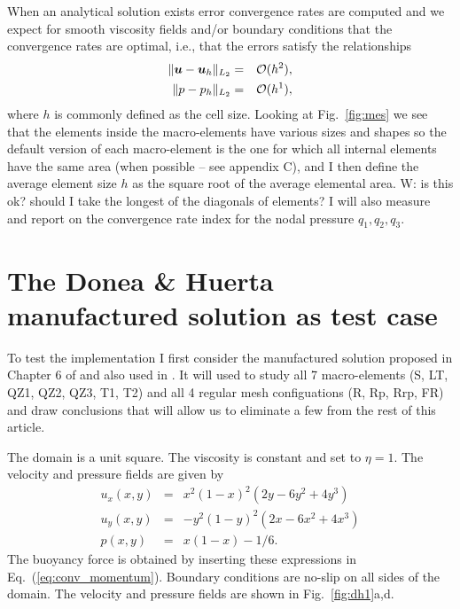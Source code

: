 \documentclass[a4paper,12pt]{article}
\begin{document}
When an analytical solution exists error convergence rates are computed and 
we expect for smooth viscosity fields and/or boundary conditions that the convergence rates 
are optimal, i.e., that the errors satisfy the relationships
\begin{eqnarray}
\| {\bm u} - {\bm u}_h \|_{L_2} &=&  {\cal O}(h^{2}),     \\  
\| p - p_h \|_{L_2}   &=& {\cal O}(h^{1}),
  \label{eq:error-rates}
\end{eqnarray}
where $h$ is commonly defined as the cell size.
Looking at Fig.~\ref{fig:mes} we see that the elements inside the macro-elements 
have various sizes and shapes so 
the default version of each macro-element is the one for which all internal elements have the same area
(when possible -- see appendix C), and I then define the average element size
$h$ as the square root of the average elemental area.
{\color{blue} W: is this ok? should I take the longest of the diagonals of elements?}
I will also measure and report on the convergence rate index for the nodal pressure $q_1,q_2,q_3$.


\section{The Donea \& Huerta manufactured solution as test case}

To test the implementation I first consider the manufactured solution 
proposed in Chapter 6 of \cite{dohu03} and also used in \cite{thba22,thba25}.
It will used to study all 7 macro-elements (S, LT, QZ1, QZ2, QZ3, T1, T2)
and all 4 regular mesh configuations (R, Rp, Rrp, FR) and draw conclusions 
that will allow us to eliminate a few from the rest of this article.
 
The domain is a unit square. The viscosity is constant and set to $\eta=1$.
The velocity and pressure fields are given by
\begin{eqnarray}
u_x(x,y) &=& x^2(1- x)^2 (2y - 6y^2 + 4y^3)  \\
u_y(x,y) &=& -y^2 (1 - y)^2 (2x - 6x^2 + 4x^3) \\
p(x,y) &=& x(1 -x)- 1/6. 
\end{eqnarray}
The buoyancy force is obtained by inserting these expressions in Eq.~(\ref{eq:conv_momentum}).
Boundary conditions are no-slip on all sides of the domain.
The velocity and pressure fields are shown in Fig.~\ref{fig:dh1}a,d.
\end{document}
